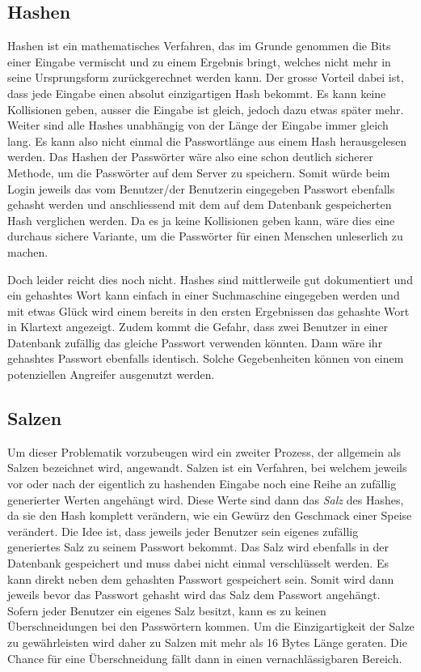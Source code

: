 \documentclass[../main.tex]{subfiles}
\begin{document}
	\subsection{Hashen}
	Hashen ist ein mathematisches Verfahren, das im Grunde genommen die Bits einer Eingabe vermischt und zu einem Ergebnis bringt, welches nicht mehr in seine Ursprungsform zurückgerechnet werden kann. Der grosse Vorteil dabei ist, dass jede Eingabe einen absolut einzigartigen Hash bekommt. Es kann keine Kollisionen geben, ausser die Eingabe ist gleich, jedoch dazu etwas später mehr. Weiter sind alle Hashes unabhängig von der Länge der Eingabe immer gleich lang. Es kann also nicht einmal die Passwortlänge aus einem Hash herausgelesen werden. Das Hashen der Passwörter wäre also eine schon deutlich sicherer Methode, um die Passwörter auf dem Server zu speichern. Somit würde beim Login jeweils das vom Benutzer/der Benutzerin eingegeben Passwort ebenfalls gehasht werden und anschliessend mit dem auf dem Datenbank gespeicherten Hash verglichen werden. Da es ja keine Kollisionen geben kann, wäre dies eine durchaus sichere Variante, um die Passwörter für einen Menschen unleserlich zu machen. 
	
	Doch leider reicht dies noch nicht. Hashes sind mittlerweile gut dokumentiert und ein gehashtes Wort kann einfach in einer Suchmaschine eingegeben werden und mit etwas Glück wird einem bereits in den ersten Ergebnissen das gehashte Wort in Klartext angezeigt. Zudem kommt die Gefahr, dass zwei Benutzer in einer Datenbank zufällig das gleiche Passwort verwenden könnten. Dann wäre ihr gehashtes Passwort ebenfalls identisch. Solche Gegebenheiten können von einem potenziellen Angreifer ausgenutzt werden. \cite{defuse} \cite{security}
	
	\subsection{Salzen}
	Um dieser Problematik vorzubeugen wird ein zweiter Prozess, der allgemein als Salzen bezeichnet wird, angewandt. Salzen ist ein Verfahren, bei welchem jeweils vor oder nach der eigentlich zu hashenden Eingabe noch eine Reihe an zufällig generierter Werten angehängt wird. Diese Werte sind dann das \emph{Salz} des Hashes, da sie den Hash komplett verändern, wie ein Gewürz den Geschmack einer Speise verändert. Die Idee ist, dass jeweils jeder Benutzer sein eigenes zufällig generiertes Salz zu seinem Passwort bekommt. Das Salz wird ebenfalls in der Datenbank gespeichert und muss dabei nicht einmal verschlüsselt werden. Es kann direkt neben dem gehashten Passwort gespeichert sein. Somit wird dann jeweils bevor das Passwort gehasht wird das Salz dem Passwort angehängt. Sofern jeder Benutzer ein eigenes Salz besitzt, kann es zu keinen Überschneidungen bei den Passwörtern kommen. Um die Einzigartigkeit der Salze zu gewährleisten wird daher zu Salzen mit mehr als 16 Bytes Länge geraten. Die Chance für eine Überschneidung fällt dann in einen vernachlässigbaren Bereich. 
	
\end{document}
